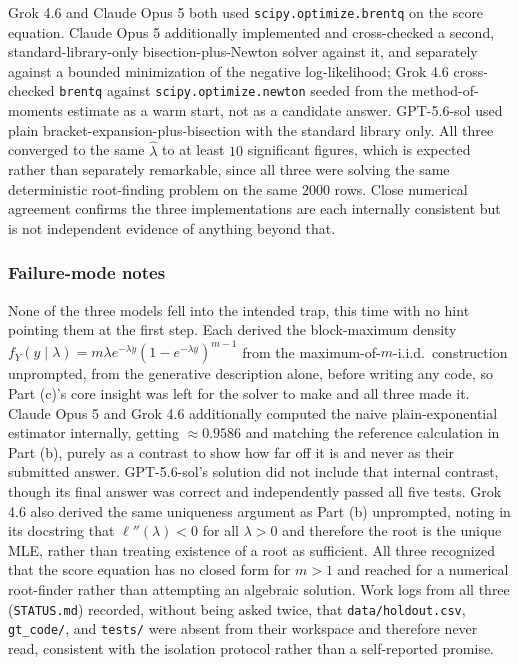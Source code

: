 \documentclass[11pt]{article}
\begin{document}
Grok 4.6 and Claude Opus 5 both used \texttt{scipy.optimize.brentq} on the score
equation. Claude Opus 5 additionally implemented and cross-checked a second,
standard-library-only bisection-plus-Newton solver against it, and separately
against a bounded minimization of the negative log-likelihood; Grok 4.6
cross-checked \texttt{brentq} against \texttt{scipy.optimize.newton} seeded from
the method-of-moments estimate as a warm start, not as a candidate answer.
GPT-5.6-sol used plain bracket-expansion-plus-bisection with the standard
library only. All three converged to the same $\hat\lambda$ to at least $10$
significant figures, which is expected rather than separately remarkable, since
all three were solving the same deterministic root-finding problem on the same
$2000$ rows. Close numerical agreement confirms the three implementations are
each internally consistent but is not independent evidence of anything beyond
that.

\subsubsection*{Failure-mode notes}

None of the three models fell into the intended trap, this time with no hint
pointing them at the first step. Each derived the block-maximum density
$f_Y(y\mid\lambda) = m\lambda e^{-\lambda y}(1-e^{-\lambda y})^{m-1}$ from the
maximum-of-$m$-i.i.d.\ construction unprompted, from the generative description
alone, before writing any code, so Part (c)'s core insight was left for the
solver to make and all three made it. Claude Opus 5 and Grok 4.6 additionally
computed the naive plain-exponential estimator internally, getting
$\approx 0.9586$ and matching the reference calculation in Part (b), purely as a
contrast to show how far off it is and never as their submitted answer.
GPT-5.6-sol's solution did not include that internal contrast, though its final
answer was correct and independently passed all five tests. Grok 4.6 also
derived the same uniqueness argument as Part (b) unprompted, noting in its
docstring that $\ell''(\lambda) < 0$ for all $\lambda>0$ and therefore the root
is the unique MLE, rather than treating existence of a root as sufficient. All
three recognized that the score equation has no closed form for $m>1$ and
reached for a numerical root-finder rather than attempting an algebraic
solution. Work logs from all three (\texttt{STATUS.md}) recorded, without being
asked twice, that \texttt{data/holdout.csv}, \texttt{gt\_code/}, and
\texttt{tests/} were absent from their workspace and therefore never read,
consistent with the isolation protocol rather than a self-reported promise.
\end{document}
